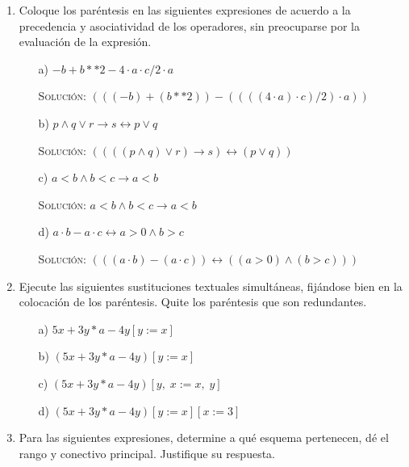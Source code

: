 \documentclass[letterpaper,11pt]{article}
\begin{document}
\begin{enumerate}
    \item Coloque los paréntesis en las siguientes expresiones de acuerdo a la 
    precedencia y asociatividad de los operadores, sin preocuparse por la
    evaluación de la expresión.

    \begin{itemize}
        \item[a)] $-b + b * * 2 - 4 \cdot a \cdot c / 2 \cdot a$ 
        
        \textsc{Solución:} 
        $(((-b) + (b * * 2)) - ((((4 \cdot a) \cdot c) / 2) \cdot a))$ 

        \item[b)] $p \land q \lor r → s ↔ p \lor q$

        \textsc{Solución:} $((((p \land q) \lor r) → s) ↔ (p \lor q))$

        \item[c)] $a < b \land b < c → a < b$

        \textsc{Solución:} $a < b \land b < c → a < b$

        \item[d)] $a \cdot b -a \cdot c ↔ a > 0 \land b > c$
        
        \textsc{Solución:} 
        $(((a \cdot b) - (a \cdot c)) ↔ ((a > 0) \land (b > c)))$
    \end{itemize}

    \item Ejecute las siguientes sustituciones textuales simultáneas, fijándose
    bien en la colocación de los paréntesis. Quite los paréntesis que son 
    redundantes.

    \begin{itemize}
        \item[a)] $5x + 3y * a - 4y[y := x]$
        \item[b)] $(5x + 3y * a - 4y)[y := x]$
        \item[c)] $(5x + 3y * a - 4y)[y, \; x := x, \;y]$
        \item[d)] $(5x + 3y * a - 4y)[y := x][x := 3]$
    \end{itemize}

    \item Para las siguientes expresiones, determine a qué esquema pertenecen,
    dé el rango y conectivo principal. Justifique su respuesta.


\end{enumerate}
\end{document}
